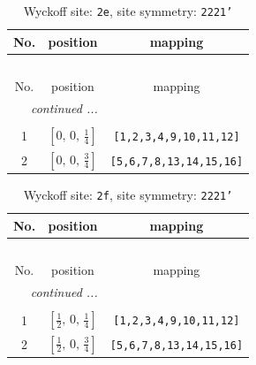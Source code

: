 \documentclass[fleqn,8pt]{jsarticle}
\begin{document}
\begin{longtable}{ccc}
\caption{Wyckoff site: {\tt 2e}, site symmetry: {\tt 2221'}}
 \\
 \hline \hline
No. & position & mapping \\ \hline \endfirsthead

\multicolumn{2}{l}{\tablename\ \thetable{}} \\
 \hline \hline
No. & position & mapping \\ \hline \endhead

 \hline \hline
\multicolumn{2}{r}{\footnotesize\it continued ...} \\ \endfoot

 \hline \hline
\multicolumn{2}{r}{} \\ \endlastfoot

1 & $\left[ 0,\, 0,\, \frac{1}{4} \right]$ & {\tt [1,2,3,4,9,10,11,12]} \\ \hline
2 & $\left[ 0,\, 0,\, \frac{3}{4} \right]$ & {\tt [5,6,7,8,13,14,15,16]} \\
\end{longtable}
\renewcommand{\arraystretch}{1.2}
\begin{longtable}{ccc}
\caption{Wyckoff site: {\tt 2f}, site symmetry: {\tt 2221'}}
 \\
 \hline \hline
No. & position & mapping \\ \hline \endfirsthead

\multicolumn{2}{l}{\tablename\ \thetable{}} \\
 \hline \hline
No. & position & mapping \\ \hline \endhead

 \hline \hline
\multicolumn{2}{r}{\footnotesize\it continued ...} \\ \endfoot

 \hline \hline
\multicolumn{2}{r}{} \\ \endlastfoot

1 & $\left[ \frac{1}{2},\, 0,\, \frac{1}{4} \right]$ & {\tt [1,2,3,4,9,10,11,12]} \\ \hline
2 & $\left[ \frac{1}{2},\, 0,\, \frac{3}{4} \right]$ & {\tt [5,6,7,8,13,14,15,16]} \\
\end{longtable}
\renewcommand{\arraystretch}{1.2}
\end{document}
